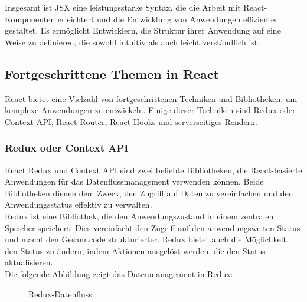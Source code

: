 Insgesamt ist JSX eine leistungsstarke Syntax, die die Arbeit mit React-Komponenten erleichtert und die Entwicklung von Anwendungen effizienter gestaltet. Es ermöglicht Entwicklern, die Struktur ihrer Anwendung auf eine Weise zu definieren, die sowohl intuitiv als auch leicht verständlich ist.	

\subsection{Fortgeschrittene Themen in React}
React bietet eine Vielzahl von fortgeschrittenen Techniken und Bibliotheken, um komplexe Anwendungen zu entwickeln. Einige dieser Techniken sind Redux oder Context API, React Router, React Hooks und serverseitiges Rendern.
\subsubsection{Redux oder Context API}
React Redux und Context API sind zwei beliebte Bibliotheken, die React-basierte Anwendungen für das Datenflussmanagement verwenden können. Beide Bibliotheken dienen dem Zweck, den Zugriff auf Daten zu vereinfachen und den Anwendungsstatus effektiv zu verwalten.\\
Redux ist eine Bibliothek, die den Anwendungszustand in einem zentralen Speicher speichert. Dies vereinfacht den Zugriff auf den anwendungsweiten Status und macht den Gesamtcode strukturierter. Redux bietet auch die Möglichkeit, den Status zu ändern, indem Aktionen ausgelöst werden, die den Status aktualisieren.\\
Die folgende Abbildung zeigt das Datenmanagement in Redux:
\begin{figure}[htbp]
	\centering
	\caption{Redux-Datenfluss}
\end{figure}\\
